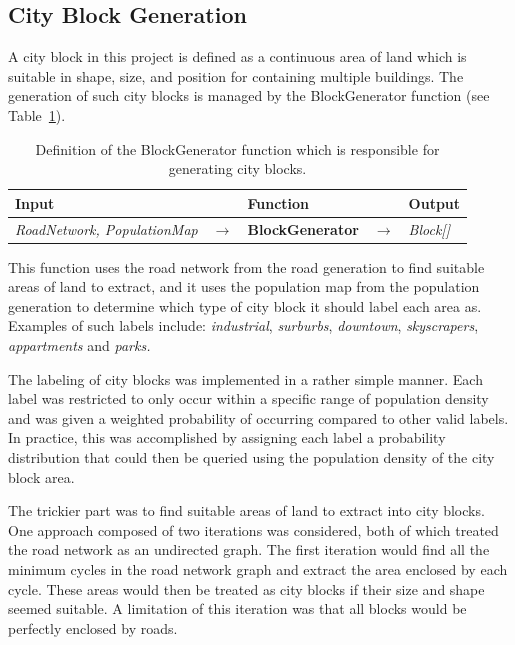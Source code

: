 \subsection{City Block Generation}

A city block in this project is defined as a continuous area of land which is suitable in shape, size, and position for containing multiple buildings.
The generation of such city blocks is managed by the BlockGenerator function (see Table~\ref{table:blockgen}).

\begin{table}[H]
  \centering
  \begin{tabular}{lllll}
    \textbf{Input}                           &               & \textbf{Function}            &               & \textbf{Output}         \\
    \midrule
    \textit{RoadNetwork, PopulationMap}      & $\rightarrow$ & \textbf{BlockGenerator}      & $\rightarrow$ & \textit{Block[]}        \\
    \bottomrule
  \end{tabular}

  \caption{Definition of the BlockGenerator function which is responsible for generating city blocks.}
  \label{table:blockgen}
\end{table}
\vspace{-0.4cm} %

This function uses the road network from the road generation to find suitable areas of land to extract, and it uses the population map from the population generation to determine which type of city block it should label each area as.
Examples of such labels include: \textit{industrial}, \textit{surburbs}, \textit{downtown}, \textit{skyscrapers}, \textit{appartments} and \textit{parks.}

The labeling of city blocks was implemented in a rather simple manner.
Each label was restricted to only occur within a specific range of population density and was given a weighted probability of occurring compared to other valid labels.
In practice, this was accomplished by assigning each label a probability distribution that could then be queried using the population density of the city block area.

The trickier part was to find suitable areas of land to extract into city blocks.
One approach composed of two iterations was considered, both of which treated the road network as an undirected graph.
The first iteration would find all the minimum cycles in the road network graph and extract the area enclosed by each cycle.
These areas would then be treated as city blocks if their size and shape seemed suitable.
A limitation of this iteration was that all blocks would be perfectly enclosed by roads.

